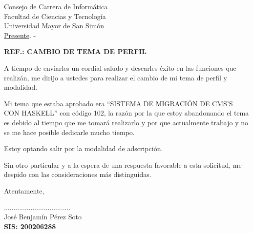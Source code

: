 \documentclass[letterpaper,12pt]{letter}
\begin{document}
\date {16 de marzo de 2012}
\begin{letter}{Consejo de Carrera de Inform\'atica \\ Facultad de Ciencias y Tecnolog\'ia \\ Universidad Mayor de San Sim\'on \\ \underline {Presente}. -}

\begin{center}
	\opening{\textbf{REF.: CAMBIO DE TEMA DE PERFIL}}
\end{center}

A tiempo de enviarles un cordial saludo y desearles éxito en las funciones que realiz\'an, me dirijo a ustedes 
para realizar el cambio de mi tema de perfil y modalidad.

Mi tema que estaba aprobado era ``SISTEMA DE MIGRACIÓN DE CMS’S CON HASKELL'' con c\'odigo 102, la raz\'on por 
la que estoy abandonando el tema es debido al tiempo que me tomar\'a realizarlo y por que actualmente trabajo 
y no se me hace posible dedicarle mucho tiempo.

Estoy optando salir por la modalidad de adscripci\'on.

Sin otro particular y a la espera de una respuesta favorable a esta solicitud, me despido con las consideraciones más distinguidas.

Atentamente,

\vspace{4cm}

\begin{center}
...................................\\
Jos\'e Benjam\'in P\'erez Soto\\
{\bfseries SIS: 200206288}
\end{center}
\end{letter}
\end{document}
